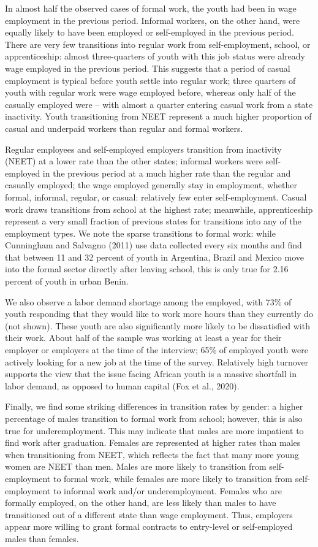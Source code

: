 \documentclass[
  11pt,
a4paper
]{article}
\begin{document}
In almost half the observed cases of formal work, the youth had been in wage employment in the previous period. Informal workers, on the other hand, were equally likely to have been employed or self-employed in the previous period. There are very few transitions into regular work from self-employment, school, or apprenticeship: almost three-quarters of youth with this job status were already wage employed in the previous period. This suggests that a period of casual employment is typical before youth settle into regular work; three quarters of youth with regular work were wage employed before, whereas only half of the casually employed were -- with almost a quarter entering casual work from a state inactivity. Youth transitioning from NEET represent a much higher proportion of casual and underpaid workers than regular and formal workers.

Regular employees and self-employed employers transition from inactivity (NEET) at a lower rate than the other states; informal workers were self-employed in the previous period at a much higher rate than the regular and casually employed; the wage employed generally stay in employment, whether formal, informal, regular, or casual: relatively few enter self-employment. Casual work draws transitions from school at the highest rate; meanwhile, apprenticeship represent a very small fraction of previous states for transitions into any of the employment types. We note the sparse transitions to formal work: while Cunningham and Salvagno (2011) use data collected every six months and find that between 11 and 32 percent of youth in Argentina, Brazil and Mexico move into the formal sector directly after leaving school, this is only true for 2.16 percent of youth in urban Benin.

We also observe a labor demand shortage among the employed, with 73\% of youth responding that they would like to work more hours than they currently do (not shown). These youth are also significantly more likely to be dissatisfied with their work. About half of the sample was working at least a year for their employer or employers at the time of the interview; 65\% of employed youth were actively looking for a new job at the time of the survey. Relatively high turnover supports the view that the issue facing African youth is a massive shortfall in labor demand, as opposed to human capital (Fox et al., 2020).

Finally, we find some striking differences in transition rates by gender: a higher percentage of males transition to formal work from school; however, this is also true for underemployment. This may indicate that males are more impatient to find work after graduation. Females are represented at higher rates than males when transitioning from NEET, which reflects the fact that many more young women are NEET than men. Males are more likely to transition from self-employment to formal work, while females are more likely to transition from self-employment to informal work and/or underemployment. Females who are formally employed, on the other hand, are less likely than males to have transitioned out of a different state than wage employment. Thus, employers appear more willing to grant formal contracts to entry-level or self-employed males than females.
\end{document}
